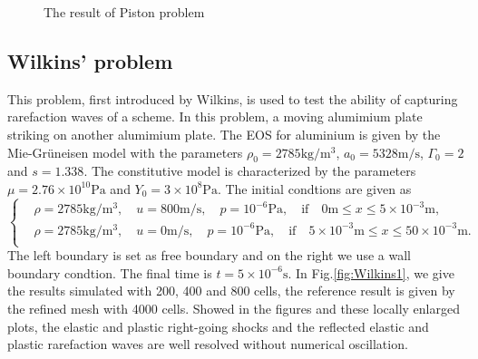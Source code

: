 \documentclass{article}
\numberwithin{equation}{section}
\numberwithin{table}{section}
\begin{document}
\begin{figure}
	  \caption{ The result of Piston problem}
	  \label{fig:piston1}
	\end{figure}

\subsection{Wilkins' problem}
This problem, first introduced by Wilkins, is used to test the  ability of capturing rarefaction waves of a scheme. In this problem, a moving alumimium plate striking on another alumimium plate. The EOS for aluminium is given by the Mie-Gr\"uneisen model with the parameters $\rho_0 = 2785 \text{kg}/\text{m}^3$, $ a_0 = 5328 \text{m} /\text{s}$, $\Gamma_0 =2$ and $s = 1.338$. The constitutive model is characterized by the parameters $\mu = 2.76\times 10^{10} \text{Pa}$ and $Y_0 = 3\times 10^8 \text{Pa}$. The initial condtions are given as
\begin{equation}
  \left\{ \begin{aligned}
	&  \rho = 2785 \text{kg}/\text{m}^3, \quad  u = 800\text{m}/\text{s}, \quad  p = 10^{-6}\text{Pa}, \quad  \text{if} \quad  0\text{m} \le x \le 5\times 10^{-3} \text{m},\\
	&  \rho = 2785 \text{kg}/\text{m}^3, \quad  u = 0\text{m}/\text{s}, \quad  p = 10^{-6}\text{Pa}, \quad  \text{if}  \quad  5 \times 10^{-3}\text{m} \le x \le 50\times 10^{-3} \text{m}.\\
	\end{aligned}
  \right.
\end{equation}
The left boundary is set as free boundary and on  the right we use a wall boundary condtion. The final time is $t =5\times 10^{-6} \text{s}$. In Fig.\ref{fig:Wilkins1}, we give the results  simulated with 200, 400 and 800 cells, the reference result is given by the refined mesh with 4000 cells. Showed in the figures and these locally enlarged plots, the elastic and plastic right-going shocks and the reflected elastic and plastic rarefaction waves are well resolved without numerical oscillation.
\end{document}
